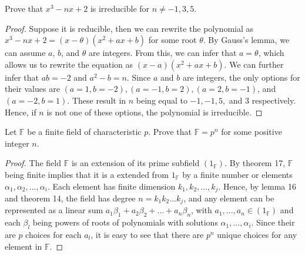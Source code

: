 \documentclass[10pt]{article}
\newenvironment{problem}[2][Problem]{\begin{trivlist}
		\item[\hskip \labelsep {\bfseries #1}\hskip \labelsep {\bfseries #2.}]}{\end{trivlist}}
\begin{document}
	\begin{problem}{1.7}
		Prove that $x^3 - nx + 2$ is irreducible for $n \neq  -1, 3, 5$.
		\begin{proof}
			Suppose it is reducible, then we can rewrite the polynomial as $x^3 - nx + 2 = (x-\theta)(x^2 + ax + b)$ for some root $\theta$. By Gauss's lemma, we can assume $a$, $b$, and $\theta$ are integers. From this, we can infer that $a = \theta$, which allows us to rewrite the equation as $(x-a)(x^2 + ax + b)$. We can further infer that $ab = -2$ and $a^2-b = n$. Since $a$ and $b$ are integers, the only options for their values are $(a=1, b=-2), (a=-1,b=2), (a=2, b=-1)$, and $(a=-2, b=1)$. These result in $n$ being equal to $-1, -1, 5,$ and $3$ respectively. Hence, if $n$ is not one of these options, the polynomial is irreducible.
		\end{proof}
	\end{problem}
	
	\begin{problem}{2.1}
		Let $\mathbb{F}$ be a finite field of characteristic $p$. Prove that $\mathbb{F} = p^n$ for some positive integer $n$.
		\begin{proof}
			The field $\mathbb{F}$ is an extension of its prime subfield $(1_\mathbb{F})$. By theorem 17, $\mathbb{F}$ being finite implies that it is a extended from $1_\mathbb{F}$ by a finite number or elements $\alpha_1, \alpha_2, ..., \alpha_i$. Each element has finite dimension $k_1, k_2, ..., k_j$. Hence, by lemma 16 and theorem 14, the field has degree $n=k_1k_2...k_j$, and any element can be represented as a linear sum $a_1\beta_1 + a_2\beta_2 + ... + a_{n}\beta_{n}$, with $a_1, ..., a_n \in (1_\mathbb{F})$ and each $\beta_l$ being powers of roots of polynomials with solutions $\alpha_1, ..., \alpha_i$. Since their are $p$ choices for each $a_l$, it is easy to see that there are $p^n$ unique choices for any element in $\mathbb{F}$.
		\end{proof}
	\end{problem}
	
\end{document}
